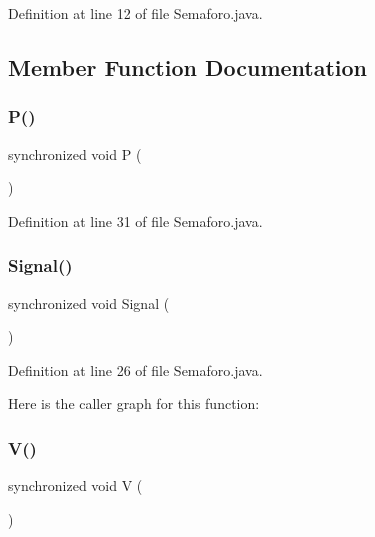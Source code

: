 Definition at line 12 of file Semaforo.\+java.



\subsection{Member Function Documentation}
\mbox{\label{classcampane_1_1_semaforo_a211c597de4dba43087fe4be696f7a8fa}} 
\subsubsection{\texorpdfstring{P()}{P()}}
{\footnotesize\ttfamily synchronized void P (\begin{DoxyParamCaption}{ }\end{DoxyParamCaption})}



Definition at line 31 of file Semaforo.\+java.

\mbox{\label{classcampane_1_1_semaforo_a70e3e26de78b8ed879d1e5a790189bc8}} 
\subsubsection{\texorpdfstring{Signal()}{Signal()}}
{\footnotesize\ttfamily synchronized void Signal (\begin{DoxyParamCaption}{ }\end{DoxyParamCaption})}



Definition at line 26 of file Semaforo.\+java.

Here is the caller graph for this function\+:
\mbox{\label{classcampane_1_1_semaforo_a25fb40b302d2a2832f7845be9250e13b}} 
\subsubsection{\texorpdfstring{V()}{V()}}
{\footnotesize\ttfamily synchronized void V (\begin{DoxyParamCaption}{ }\end{DoxyParamCaption})}



